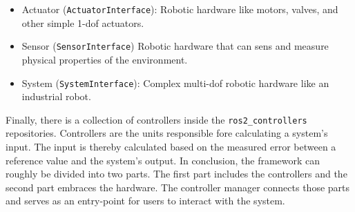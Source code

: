 \begin{itemize}
    \item Actuator (\texttt{ActuatorInterface}): Robotic hardware like motors, valves, and other simple 1-\gls{dof} actuators.
    \item Sensor (\texttt{SensorInterface}) Robotic hardware that can sens and measure physical properties of the environment.
    \item System (\texttt{SystemInterface}): Complex multi-\gls{dof} robotic hardware like an industrial robot.
\end{itemize}
 Finally, there is a collection of controllers inside the \texttt{ros2\_controllers} repositories. Controllers are the units responsible fore calculating a system's input. The input is thereby calculated based on the measured error between a reference value and the system's output.\newline
 In conclusion, the framework can roughly be divided into two parts. The first part includes the controllers and the second part embraces the hardware. The controller manager connects those parts and serves as an entry-point for users to interact with the system.

